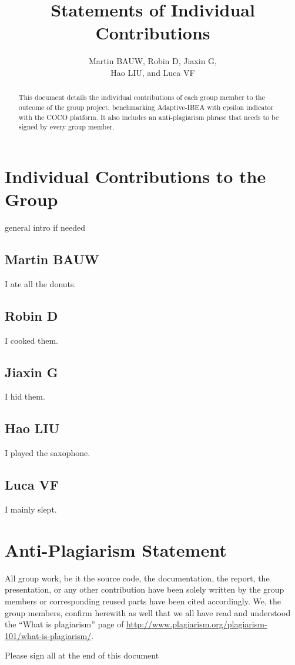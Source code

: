 \documentclass{article}
\newcommand{\REPLACE}[1]{{\color{red} #1}}
\newcommand{\REMOVE}[1]{{\color{red} #1}}
\begin{document}
\title{Statements of Individual Contributions}

\author{Martin BAUW, Robin D, Jiaxin G,\\ Hao LIU, and Luca VF}
\maketitle
\begin{abstract}
This document details the individual contributions of each group member to the outcome of the group project, benchmarking \REPLACE{Adaptive-IBEA with epsilon indicator} with the COCO platform. It also includes an anti-plagiarism phrase that needs to be signed by every group member.
\end{abstract}


\section{Individual Contributions to the Group}
\REPLACE{general intro if needed}

\subsection{\REPLACE{Martin BAUW}}
I ate all the donuts.

\subsection{\REPLACE{Robin D}}
I cooked them.

\subsection{\REPLACE{Jiaxin G}}
I hid them.

\subsection{\REPLACE{Hao LIU}}
I played the saxophone.

\subsection{\REPLACE{Luca VF}}
I mainly slept.

\section{Anti-Plagiarism Statement}
All group work, be it the source code, the documentation, the report, the presentation, or any other contribution have been solely written by the group members or corresponding reused parts have been cited accordingly. We, the group members, confirm herewith as well that we all have read and understood the ``What is plagiarism'' page of \url{http://www.plagiarism.org/plagiarism-101/what-is-plagiarism/}.


\REMOVE{Please sign all at the end of this document}
\end{document}
